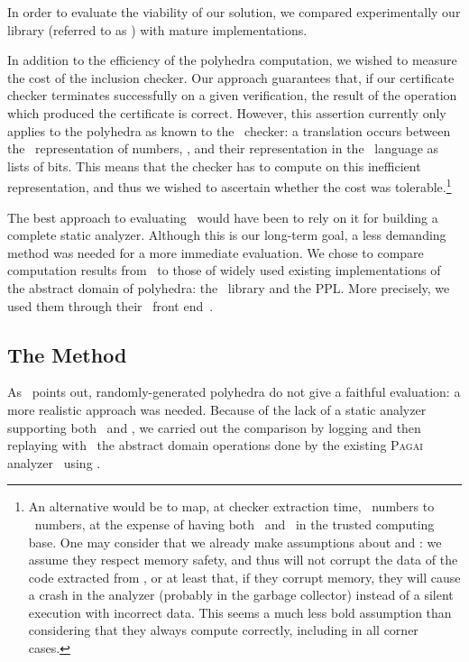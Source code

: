 In order to evaluate the viability of our solution, we compared experimentally our library (referred to as {\libpoly}) with mature implementations.

In addition to the efficiency of the polyhedra computation, we wished to measure the cost of the inclusion checker.
Our approach guarantees that,
if our certificate checker terminates successfully on a given verification,
the result of the operation which produced the certificate is correct.
However, this assertion currently only applies to the polyhedra as known to the \coq\ checker:
a translation occurs between the \ocaml\ representation of numbers, \zarith ,
and their representation in the \coq\ language as lists of bits.
This means that the checker has to compute on this inefficient representation, and thus we wished to ascertain whether the cost was tolerable.\footnote{An alternative would be to map, at checker extraction time, \coq\ numbers to \zarith\ numbers,
at the expense of having both \zarith\ and \gmp\ in the trusted computing base.
One may consider that we already make assumptions about {\zarith} and {\gmp}: we assume they respect memory safety, and thus will not corrupt the data of the {\ocaml} code extracted from {\coq}, or at least that, if they corrupt memory, they will cause a crash in the analyzer (probably in the garbage collector) instead of a silent execution with incorrect data.
This seems a much less bold assumption than considering that they always compute correctly, including in all corner cases.}

The best approach to evaluating \libpoly\ would have been to rely on it for
building a complete static analyzer.
Although this is our long-term goal, a less demanding method was needed for a
more immediate evaluation.
We chose to compare computation results from \libpoly\ to those of widely
used existing implementations of the abstract domain of polyhedra:
the \newpolka\ library and the PPL.
More precisely, we used them through their \apron\ front end~\cite{jeannet09}.
\subsection{The Method}
\label{expmethod}
As~\cite{Monniaux_CAV09} points out, randomly-generated polyhedra do not give a faithful evaluation:
a more realistic approach was needed.
Because of the lack of a static analyzer supporting both \apron\ and \libpoly ,
we carried out the comparison by logging and then
replaying with \libpoly\ the abstract domain operations done
by the existing \textsc{Pagai} analyzer~\cite{henry012} using \apron .

